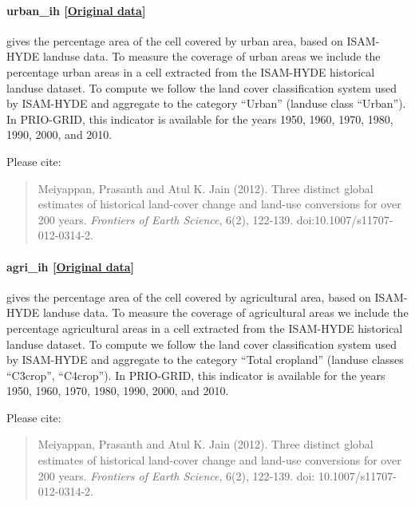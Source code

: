 \documentclass[]{book}
\begin{document}
\paragraph{urban\_ih
{[}\href{https://www.atmos.illinois.edu/~meiyapp2/datasets.htm}{Original
data}{]}}\label{urban-ih}

gives the percentage area of the cell covered by urban area, based on
ISAM-HYDE landuse data. To measure the coverage of urban areas we
include the percentage urban areas in a cell extracted from the
ISAM-HYDE historical landuse dataset. To compute  we
follow the land cover classification system used by ISAM-HYDE and
aggregate to the category ``Urban'' (landuse class ``Urban''). In
PRIO-GRID, this indicator is available for the years 1950, 1960, 1970,
1980, 1990, 2000, and 2010.

Please cite:

\begin{quote}
Meiyappan, Prasanth and Atul K. Jain (2012). Three distinct global
estimates of historical land-cover change and land-use conversions for
over 200 years. \emph{Frontiers of Earth Science}, 6(2), 122-139.
doi:10.1007/s11707-012-0314-2.
\end{quote}

\paragraph{agri\_ih
{[}\href{https://www.atmos.illinois.edu/~meiyapp2/datasets.htm}{Original
data}{]}}\label{agri-ih}

gives the percentage area of the cell covered by agricultural area,
based on ISAM-HYDE landuse data. To measure the coverage of agricultural
areas we include the percentage agricultural areas in a cell extracted
from the ISAM-HYDE historical landuse dataset. To compute
 we follow the land cover classification system used by
ISAM-HYDE and aggregate to the category ``Total cropland'' (landuse
classes ``C3crop'', ``C4crop''). In PRIO-GRID, this indicator is
available for the years 1950, 1960, 1970, 1980, 1990, 2000, and 2010.

Please cite:

\begin{quote}
Meiyappan, Prasanth and Atul K. Jain (2012). Three distinct global
estimates of historical land-cover change and land-use conversions for
over 200 years. \emph{Frontiers of Earth Science}, 6(2), 122-139. doi:
10.1007/s11707-012-0314-2.
\end{quote}
\end{document}
